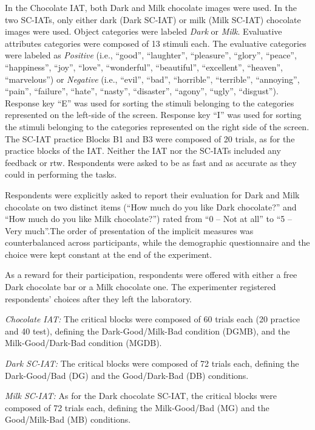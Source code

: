 \documentclass[12pt]{book}
\begin{document}
In the Chocolate IAT, both Dark and Milk chocolate images were used. In the two SC-IATs, only either dark (Dark SC-IAT) or milk (Milk SC-IAT) chocolate images were used. Object categories were labeled \emph{Dark} or \emph{Milk}. Evaluative attributes categories were composed of 13 stimuli each. The evaluative categories were labeled as \emph{Positive} (i.e., ``good'', ``laughter'', ``pleasure'', ``glory'', ``peace'', ``happiness'', ``joy'', ``love'', ``wonderful'', ``beautiful'', ``excellent'', ``heaven'', ``marvelous'') or \emph{Negative} (i.e., ``evil'', ``bad'', ``horrible'', ``terrible'', ``annoying'', ``pain'', ``failure'', ``hate'', ``nasty'', ``disaster'', ``agony'', ``ugly'', ``disgust'').  
Response key ``E'' was used for sorting the stimuli belonging to the categories represented on the left-side of the screen. Response key ``I'' was used for sorting the stimuli belonging to the categories represented on the right side of the screen.  
The SC-IAT practice Blocks B1 and B3 were composed of 20 trials, as for the practice blocks of the IAT. 
Neither the IAT nor the SC-IATs included any feedback or rtw. Respondents were asked to be as fast and as accurate as they could in performing the tasks. 

Respondents were explicitly asked to report their evaluation for Dark and Milk chocolate on two distinct items (``How much do you like Dark chocolate?'' and ``How much do you like Milk chocolate?'') rated from ``0 – Not at all'' to ``5 – Very much''.The order of presentation of the implicit measures was counterbalanced across participants, while the demographic questionnaire and the choice were kept constant at the end of the experiment.

As a reward for their participation, respondents were offered with either a free Dark chocolate bar or a Milk chocolate one. The experimenter registered respondents' choices after they left the laboratory.

\emph{Chocolate IAT:} The critical blocks were composed of 60 trials each (20 practice and 40 test), defining the Dark-Good/Milk-Bad condition (DGMB), and the Milk-Good/Dark-Bad condition (MGDB). 

\emph{Dark SC-IAT:} The critical blocks were composed of 72 trials each, defining the Dark-Good/Bad (DG) and the Good/Dark-Bad (DB) conditions.

\emph{Milk SC-IAT:} As for the Dark chocolate SC-IAT, the critical blocks were composed of 72 trials each, defining the Milk-Good/Bad (MG) and the Good/Milk-Bad (MB) conditions.
\end{document}
